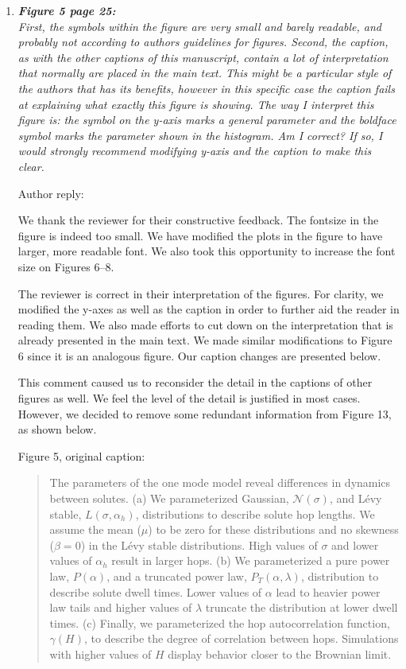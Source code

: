 \documentclass{article}
\begin{document}
\begin{enumerate}[label={Comment \theenumi :}, leftmargin=3.9\parindent]
  \item \textit{\textbf{Figure 5 page 25:} \\
		First, the symbols within the figure are very small and barely readable, and probably not
		according to authors guidelines for figures. Second, the caption, as with the other captions of
		this manuscript, contain a lot of interpretation that normally are placed in the main text. This
		might be a particular style of the authors that has its benefits, however in this specific case the
		caption fails at explaining what exactly this figure is showing. The way I interpret this figure is:
		the symbol on the y-axis marks a general parameter and the boldface symbol marks the
		parameter shown in the histogram. Am I correct? If so, I would strongly recommend modifying
		y-axis and the caption to make this clear.}
		
		Author reply:
		
		We thank the reviewer for their constructive feedback. The fontsize in the figure is indeed too small.
		We have modified the plots in the figure to have larger, more readable font. We also took this 
		opportunity to increase the font size on Figures 6--8.
		
		The reviewer is correct in their interpretation of the figures. For clarity, we modified the y-axes as
		well as the caption in order to further aid the reader in reading them. We also made efforts to cut
        down on the interpretation that is already presented in the main text. We made similar modifications
        to Figure 6 since it is an analogous figure. Our caption changes are presented below.
		
		This comment caused us to reconsider the detail in the captions of other figures as well. We feel
		the level of the detail is justified in most cases. However, we decided to remove some redundant
		information from Figure 13, as shown below.
		
		Figure 5, original caption:
		
		\begin{quote}
		
		  The parameters of the one mode model reveal differences in dynamics
	      between solutes. (a) We parameterized Gaussian,
	      $\mathcal{N}(\sigma)$, and L\'evy stable, $L(\sigma, \alpha_h)$,
	      distributions to describe solute hop lengths. We assume the mean
	      ($\mu$) to be zero for these distributions and no
	      skewness ($\beta = 0$) in the L\'evy stable distributions. High
	      values of $\sigma$ and lower values of $\alpha_h$ result in larger
	      hops. (b) We parameterized a pure power law, $P(\alpha)$, and a
	      truncated power law, $P_T(\alpha, \lambda)$, distribution to describe
	      solute dwell times. Lower values of $\alpha$ lead to heavier power
	      law tails and higher values of $\lambda$ truncate the distribution at
	      lower dwell times. (c) Finally, we parameterized the hop
	      autocorrelation function, $\gamma(H)$, to describe the degree of
	      correlation between hops. Simulations with higher values of $H$ display
	      behavior closer to the Brownian limit.
	      

\end{quote}
\end{enumerate}
\end{document}
